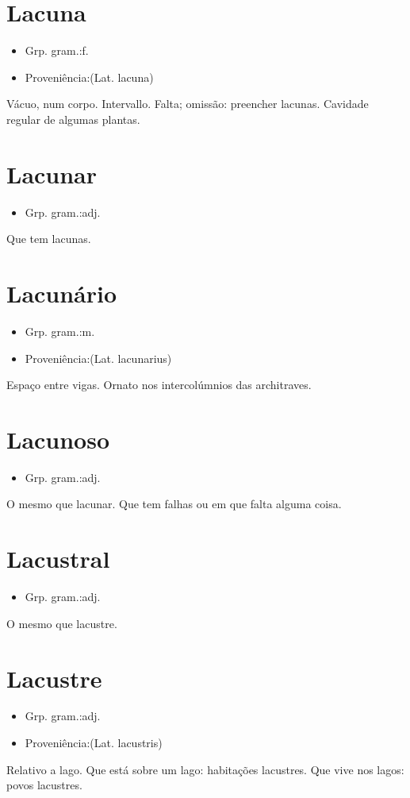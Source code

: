 \section{Lacuna}
\begin{itemize}
\item {Grp. gram.:f.}
\end{itemize}
\begin{itemize}
\item {Proveniência:(Lat. \textunderscore lacuna\textunderscore )}
\end{itemize}
Vácuo, num corpo.
Intervallo.
Falta; omissão: \textunderscore preencher lacunas\textunderscore .
Cavidade regular de algumas plantas.
\section{Lacunar}
\begin{itemize}
\item {Grp. gram.:adj.}
\end{itemize}
Que tem lacunas.
\section{Lacunário}
\begin{itemize}
\item {Grp. gram.:m.}
\end{itemize}
\begin{itemize}
\item {Proveniência:(Lat. \textunderscore lacunarius\textunderscore )}
\end{itemize}
Espaço entre vigas.
Ornato nos intercolúmnios das architraves.
\section{Lacunoso}
\begin{itemize}
\item {Grp. gram.:adj.}
\end{itemize}
O mesmo que \textunderscore lacunar\textunderscore .
Que tem falhas ou em que falta alguma coisa.
\section{Lacustral}
\begin{itemize}
\item {Grp. gram.:adj.}
\end{itemize}
O mesmo que \textunderscore lacustre\textunderscore .
\section{Lacustre}
\begin{itemize}
\item {Grp. gram.:adj.}
\end{itemize}
\begin{itemize}
\item {Proveniência:(Lat. \textunderscore lacustris\textunderscore )}
\end{itemize}
Relativo a lago.
Que está sobre um lago: \textunderscore habitações lacustres\textunderscore .
Que vive nos lagos: \textunderscore povos lacustres\textunderscore .
